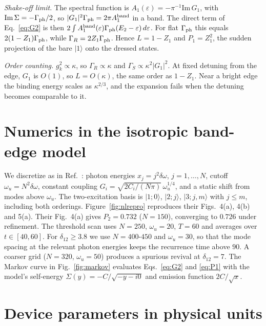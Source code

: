 \documentclass[aps,prresearch,twocolumn,superscriptaddress,nofootinbib,longbibliography,floatfix]{revtex4-2}
\begin{document}
\emph{Shake-off limit.} The spectral function is $A_1(\varepsilon)=-\pi^{-1}\mathrm{Im}\,G_1$, with
$\mathrm{Im}\,\Sigma=-\Gamma_{\rm ph}/2$, so $|G_1|^2\Gamma_{\rm ph}=2\pi A_1^{\rm band}$ in a band. The direct term of
Eq.~\eqref{eq:G2} is then $2\int A_1^{\rm band}(\varepsilon)\Gamma_{\rm ph}(E_2-\varepsilon)\,d\varepsilon$. For flat
$\Gamma_{\rm ph}$ this equals $2(1-Z_1)\Gamma_{\rm ph}$, while $\Gamma_R=2Z_1\Gamma_{\rm ph}$. Hence $L=1-Z_1$ and
$P_1=Z_1^2$, the sudden projection of the bare $|1\rangle$ onto the dressed states.

\emph{Order counting.} $g_k^2\propto\kappa$, so $\Gamma_R\propto\kappa$ and $\Gamma_S\propto\kappa^2|G_1|^2$. At fixed
detuning from the edge, $G_1$ is $O(1)$, so $L=O(\kappa)$, the same order as $1-Z_1$. Near a bright edge the binding
energy scales as $\kappa^{2/3}$, and the expansion fails when the detuning becomes comparable to it.

\section{Numerics in the isotropic band-edge model}\label{app:nl}
We discretize as in Ref.~\cite{NikolopoulosLambropoulos2000}: photon energies $x_j=j^2\delta\omega$, $j=1,\dots,N$,
cutoff $\omega_u=N^2\delta\omega$, constant coupling $G_i=\sqrt{2C_i/(N\pi)}\,\omega_u^{1/4}$, and a static shift from modes
above $\omega_u$. The two-excitation basis is $|1;0\rangle$, $|2;j\rangle$, $|3;j,m\rangle$ with $j\le m$, including both
orderings. Figure~\ref{fig:nlrepro} reproduces their Figs.~4(a), 4(b) and 5(a). Their Fig.~4(a) gives $P_2=0.732$
($N=150$), converging to $0.726$ under refinement. The threshold scan uses $N=250$, $\omega_u=20$, $T=60$ and averages over
$t\in[40,60]$. For $\delta_{12}\ge3.8$ we use $N=400$-$450$ and $\omega_u=30$, so that the mode spacing at the relevant
photon energies keeps the recurrence time above $90$. A coarser grid ($N=320$, $\omega_u=50$) produces a spurious revival
at $\delta_{12}=7$. The Markov curve in Fig.~\ref{fig:markov} evaluates Eqs.~\eqref{eq:G2} and \eqref{eq:P1} with the
model's self-energy $\Sigma(y)=-C/\sqrt{-y-i0}$ and emission function $2C/\sqrt{x}$.

\section{Device parameters in physical units}\label{app:ghz}
\end{document}
